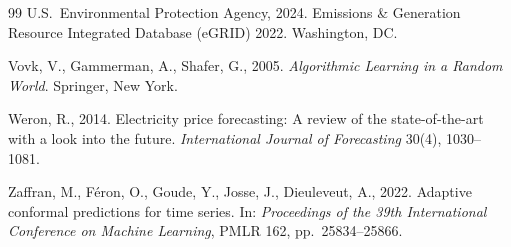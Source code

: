 \documentclass[preprint,12pt,authoryear]{elsarticle}
\begin{document}
\begin{thebibliography}{99}
U.S.\ Environmental Protection Agency, 2024. Emissions \& Generation Resource Integrated Database (eGRID) 2022. Washington, DC.

Vovk, V., Gammerman, A., Shafer, G., 2005. \textit{Algorithmic Learning in a Random World}. Springer, New York.

Weron, R., 2014. Electricity price forecasting: A review of the state-of-the-art with a look into the future. \textit{International Journal of Forecasting} 30(4), 1030--1081.

Zaffran, M., F\'eron, O., Goude, Y., Josse, J., Dieuleveut, A., 2022. Adaptive conformal predictions for time series. In: \textit{Proceedings of the 39th International Conference on Machine Learning}, PMLR 162, pp.~25834--25866.

\end{thebibliography}
\end{document}
